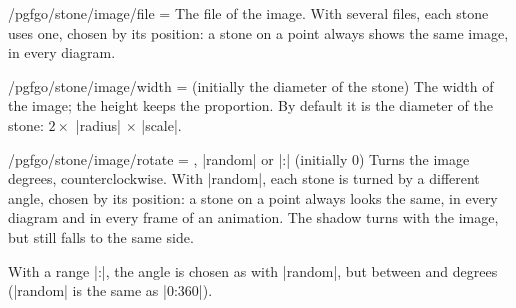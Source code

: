 \begin{key}{/pgfgo/stone/image/file = }
	The file of the image. With several files, each stone uses one, chosen by its position: a stone on a point always shows the same image, in every diagram.

	\begin{codeexample}[]
		\begin{goban}[5, partial = B2:D4]
		\end{goban}
	\end{codeexample}
\end{key}

\begin{key}{/pgfgo/stone/image/width =  (initially the diameter of the stone)}
	The width of the image; the height keeps the proportion. By default it is the diameter of the stone: $2 \times$ |radius| $\times$ |scale|.
\end{key}

\begin{key}{/pgfgo/stone/image/rotate = , |random| or |:| (initially 0)}
	Turns the image  degrees, counterclockwise. With |random|, each stone is turned by a different angle, chosen by its position: a stone on a point always looks the same, in every diagram and in every frame of an animation. The shadow turns with the image, but still falls to the same side.

	\begin{codeexample}[]
		\begin{goban}[5, partial = B2:D4]
		\end{goban}
	\end{codeexample}

	With a range |:|, the angle is chosen as with |random|, but between  and  degrees (|random| is the same as |0:360|).

	\begin{codeexample}[]
		\begin{goban}[5, partial = B2:D4]
		\end{goban}
	\end{codeexample}
\end{key}

